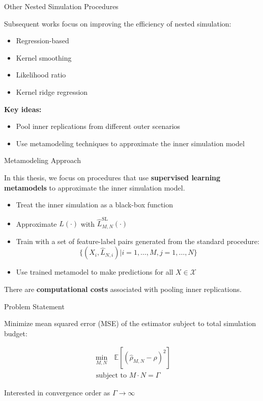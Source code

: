 \documentclass[9pt,handout]{beamer}
\begin{document}
\begin{frame}{Other Nested Simulation Procedures}

Subsequent works focus on improving the efficiency of nested simulation:
\begin{itemize}
    \item Regression-based~\citep{broadie2015risk}
    \item Kernel smoothing~\citep{hong2017kernel}
    \item Likelihood ratio~\citep{feng2020optimal}
    \item Kernel ridge regression~\citep{zhang2022sample}
\end{itemize}

\vspace{10pt}

\textbf{Key ideas:} 
\begin{itemize}
    \item Pool inner replications from different outer scenarios 
    \item Use metamodeling techniques to approximate the inner simulation model
\end{itemize}

\end{frame}

\begin{frame}{Metamodeling Approach}

In this thesis, we focus on procedures that use \textbf{supervised learning metamodels} to approximate the inner simulation model.   

\begin{itemize}
    \item Treat the inner simulation as a black-box function
    \item Approximate $L(\cdot)$ with $\hat{L}^{\text{SL}}_{M, N}(\cdot)$
    \item Train with a set of feature-label pairs generated from the standard procedure:
    $$\{(X_i, \hat{L}_{N, i}) \vert i=1, \ldots, M, j=1, \ldots, N\}$$
    \item Use trained metamodel to make predictions for all $X \in \mathcal{X}$
\end{itemize}

There are \textbf{computational costs} associated with pooling inner replications.

\end{frame}


\begin{frame}{Problem Statement}

Minimize mean squared error (MSE) of the estimator subject to total simulation budget:

\begin{align*}
\min_{M, N} ~~~ \mathbb{E} \left[ \left( \hat{\rho}_{M, N} - \rho \right)^2 \right] \\
\text{ subject to } M \cdot N = \Gamma
\end{align*}

Interested in convergence order as $\Gamma \to \infty$

\end{frame}
\end{document}
